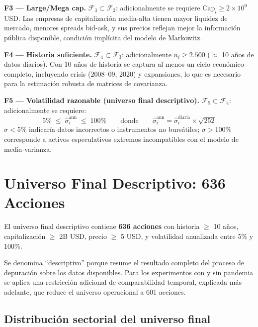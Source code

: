 \medskip

\textbf{F3 --- Large/Mega cap.}
$\mathcal{F}_3 \subset \mathcal{F}_2$: adicionalmente se requiere
$\text{Cap}_i \geq 2 \times 10^9$ USD.
Las empresas de capitalización media-alta tienen mayor liquidez de mercado,
menores spreads bid-ask, y sus precios reflejan mejor la información pública
disponible, condición implícita del modelo de Markowitz.

\medskip

\textbf{F4 --- Historia suficiente.}
$\mathcal{F}_4 \subset \mathcal{F}_3$: adicionalmente $n_i \geq 2.500$
($\approx$ 10 años de datos diarios).
Con 10 años de historia se captura al menos un ciclo económico completo,
incluyendo crisis (2008--09, 2020) y expansiones, lo que es necesario
para la estimación robusta de matrices de covarianza.

\medskip

\textbf{F5 --- Volatilidad razonable (universo final descriptivo).}
$\mathcal{F}_5 \subset \mathcal{F}_4$: adicionalmente se requiere:
\[
  5\% \;\leq\; \hat{\sigma}_{i}^{\text{ann}} \;\leq\; 100\%
  \qquad \text{donde} \qquad
  \hat{\sigma}_{i}^{\text{ann}} = \hat{\sigma}_{i}^{\text{diaria}} \times \sqrt{252}
\]
$\sigma < 5\%$ indicaría datos incorrectos o instrumentos no bursátiles;
$\sigma > 100\%$ corresponde a activos especulativos extremos incompatibles
con el modelo de media-varianza.

\section*{Universo Final Descriptivo: 636 Acciones}

El universo final descriptivo contiene \textbf{636 acciones} con historia
$\geq$ 10 años, capitalización $\geq$ 2B USD, precio $\geq$ 5 USD, y
volatilidad anualizada entre 5\% y 100\%.

Se denomina ``descriptivo'' porque resume el resultado completo del proceso de
depuración sobre los datos disponibles. Para los experimentos con y sin
pandemia se aplica una restricción adicional de comparabilidad temporal,
explicada más adelante, que reduce el universo operacional a 601 acciones.

\subsection*{Distribución sectorial del universo final}

